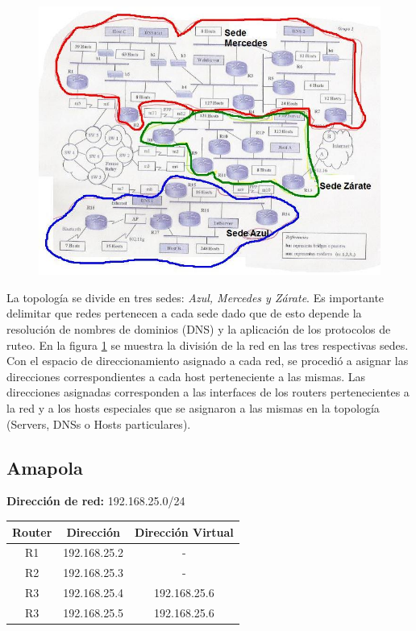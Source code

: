\begin{figure}[H]
      \centering
      \begin{center}
      \includegraphics[width=1.2\textwidth]{Imagenes/sedes.jpg}
      \end{center}
      \label{fig002}
\end{figure}


La topología se divide en tres sedes: \textit{Azul, Mercedes y Zárate}. Es importante delimitar que redes pertenecen a cada sede
dado que de esto depende la resolución de nombres de dominios (DNS) y la aplicación de los protocolos de ruteo. En la figura \ref{fig002} se muestra 
la división de la red en las tres respectivas sedes. \\
\indent Con el espacio de direccionamiento asignado a cada red, se procedió a asignar las direcciones correspondientes a cada host perteneciente a las mismas. 
Las direcciones asignadas corresponden a las interfaces de los routers pertenecientes a la red y a los hosts especiales que se asignaron a las mismas
en la topología (Servers, DNSs o Hosts particulares). \\ 

\subsection{Amapola}

\textbf{Dirección de red:} 192.168.25.0/24

\begin{table}[!htbp]
\centering
  \begin{tabular}{|c|c|c|}
    \hline
	Router & Dirección & Dirección Virtual\\ \hline
	R1 & 192.168.25.2 &  - \\ \hline
	R2 & 192.168.25.3 &  - \\ \hline
	R3 & 192.168.25.4 & 192.168.25.6 \\ \hline
	R3 & 192.168.25.5 & 192.168.25.6 \\
    \hline
  \end{tabular}
\end{table}

